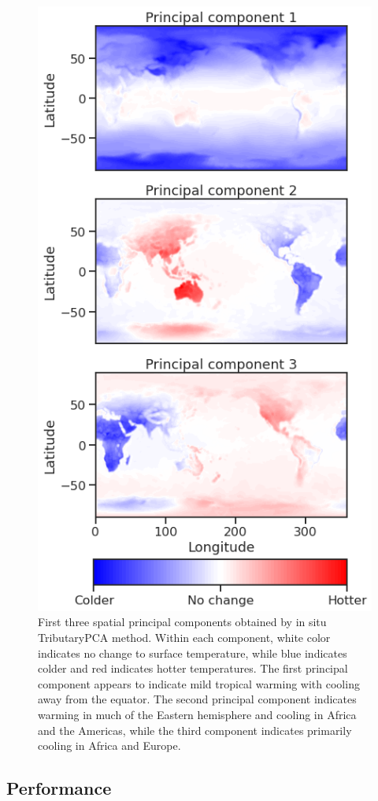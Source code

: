 \documentclass{juliacon}
\begin{document}
\begin{figure}
    \centering
    \includegraphics[width=0.8\linewidth]{figures/insitu_pca.png}
    \caption{First three spatial principal components obtained by in situ TributaryPCA method. Within each component, white color indicates no change to surface temperature, while blue indicates colder and red indicates hotter temperatures. The first principal component appears to indicate mild tropical warming with cooling away from the equator. The second principal component indicates warming in much of the Eastern hemisphere and cooling in Africa and the Americas, while the third component indicates primarily cooling in Africa and Europe.}
    \label{fig:pca_results}
\end{figure}

\subsection{Performance}
\end{document}
